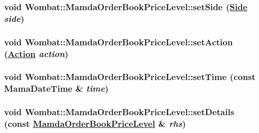 \hypertarget{classWombat_1_1MamdaOrderBookPriceLevel_daf682cbf0f026e8261f5ce0b9bea0c1}{
\subsubsection[setSide]{\setlength{\rightskip}{0pt plus 5cm}void Wombat::Mamda\-Order\-Book\-Price\-Level::set\-Side (\hyperlink{classWombat_1_1MamdaOrderBookPriceLevel_384c34b0a74d874b8969dee9b0d3718d}{Side} {\em side})}}
\label{classWombat_1_1MamdaOrderBookPriceLevel_daf682cbf0f026e8261f5ce0b9bea0c1}


\hypertarget{classWombat_1_1MamdaOrderBookPriceLevel_76848ef7ad6690d93b9c23a660136ef2}{
\subsubsection[setAction]{\setlength{\rightskip}{0pt plus 5cm}void Wombat::Mamda\-Order\-Book\-Price\-Level::set\-Action (\hyperlink{classWombat_1_1MamdaOrderBookPriceLevel_bd3407b4250fc6f7a42d94b6d32e358a}{Action} {\em action})}}
\label{classWombat_1_1MamdaOrderBookPriceLevel_76848ef7ad6690d93b9c23a660136ef2}


\hypertarget{classWombat_1_1MamdaOrderBookPriceLevel_edf661cde995fb8dd3f119d2ca7e28f3}{
\subsubsection[setTime]{\setlength{\rightskip}{0pt plus 5cm}void Wombat::Mamda\-Order\-Book\-Price\-Level::set\-Time (const Mama\-Date\-Time \& {\em time})}}
\label{classWombat_1_1MamdaOrderBookPriceLevel_edf661cde995fb8dd3f119d2ca7e28f3}


\hypertarget{classWombat_1_1MamdaOrderBookPriceLevel_0cd6f5f488c07ec82512edff81c3fb6a}{
\subsubsection[setDetails]{\setlength{\rightskip}{0pt plus 5cm}void Wombat::Mamda\-Order\-Book\-Price\-Level::set\-Details (const \hyperlink{classWombat_1_1MamdaOrderBookPriceLevel}{Mamda\-Order\-Book\-Price\-Level} \& {\em rhs})}}
\label{classWombat_1_1MamdaOrderBookPriceLevel_0cd6f5f488c07ec82512edff81c3fb6a}


